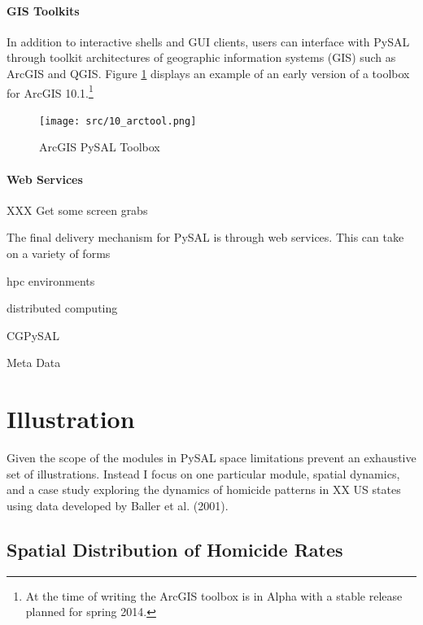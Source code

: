 \documentclass[11pt, titlepage]{article}
\begin{document}
\paragraph{GIS Toolkits}

In addition to interactive shells and GUI clients, users can interface
with PySAL through toolkit architectures of geographic information
systems (GIS) such as ArcGIS and QGIS. Figure \ref{f:arcgis} displays an example of an
early version of a toolbox for ArcGIS 10.1.\footnote{At the time of
  writing the ArcGIS toolbox is in Alpha with a stable release planned
  for spring 2014.}


\begin{figure}[ht]
\begin{center}
\texttt{[image: src/10\_arctool.png]}
\end{center}
\caption{ArcGIS PySAL Toolbox}
\label{f:arcgis}
\end{figure}   


\paragraph{Web Services}

XXX Get some screen grabs

The final delivery mechanism for PySAL is through web services. This can
take on a variety of forms

hpc environments

distributed computing

CGPySAL

Meta Data

\section{Illustration}

Given the scope of the modules in PySAL space limitations prevent an
exhaustive set of illustrations. Instead I focus on one particular
module, spatial dynamics, and a case study exploring the dynamics of
homicide patterns in XX US states using data developed by Baller et al.
(2001).

\subsection{Spatial Distribution of Homicide Rates}
\end{document}
